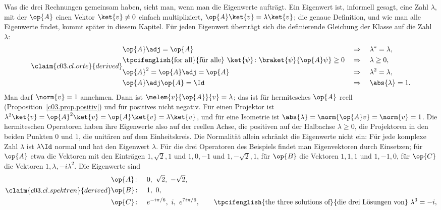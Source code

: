 Was die drei Rechnungen gemeinsam haben, sieht man, wenn man die Eigenwerte aufträgt. Ein
Eigenwert ist, informell gesagt, eine Zahl $\lambda$, mit der $\op{A}$ einen Vektor
$\ket{v} \neq 0$ einfach multipliziert, $\op{A}\ket{v} = \lambda\ket{v}$; die genaue Definition,
und wie man alle Eigenwerte findet, kommt später in diesem Kapitel. Für jeden Eigenwert
überträgt sich die definierende Gleichung der Klasse auf die Zahl $\lambda$:
\begin{equation}\label{c03.eq.orte}\claim{c03.cl.orte}{derived}
  \begin{aligned}
    &\op{A}\adj = \op{A} &&\Rightarrow\quad \lambda^* = \lambda , \\
    &\text{\tpcifenglish{for all}{für alle} } \ket{\psi}\colon \braket{\psi}{\op{A}\psi} \geq 0 &&\Rightarrow\quad \lambda \geq 0 , \\
    &\op{A}^2 = \op{A}\adj = \op{A} &&\Rightarrow\quad \lambda^2 = \lambda , \\
    &\op{A}\adj\op{A} = \Id &&\Rightarrow\quad \abs{\lambda} = 1 .
  \end{aligned}
\end{equation}
Man darf $\norm{v} = 1$ annehmen. Dann ist $\melem{v}{\op{A}}{v} = \lambda$; das ist für
hermitesches $\op{A}$ reell (Proposition~\ref{c03.prop.positiv}) und für positives nicht
negativ. Für einen Projektor ist $\lambda^2\ket{v} = \op{A}^2\ket{v} = \op{A}\ket{v} = \lambda\ket{v}$,
und für eine Isometrie ist $\abs{\lambda} = \norm{\op{A}v} = \norm{v} = 1$. Die hermiteschen
Operatoren haben ihre Eigenwerte also auf der reellen Achse, die positiven auf der Halbachse
$\lambda \geq 0$, die Projektoren in den beiden Punkten $0$ und $1$, die unitären auf dem
Einheitskreis. Die Normalität allein schränkt die Eigenwerte nicht ein: Für jede komplexe Zahl
$\lambda$ ist $\lambda\Id$ normal und hat den Eigenwert $\lambda$. Für die drei Operatoren des
Beispiels findet man Eigenvektoren durch Einsetzen; für $\op{A}$ etwa die Vektoren mit den
Einträgen $1, \sqrt{2}, 1$ und $1, 0, -1$ und $1, -\sqrt{2}, 1$, für $\op{B}$ die Vektoren
$1, 1, 1$ und $1, -1, 0$, für $\op{C}$ die Vektoren $1, \lambda, -i\lambda^2$. Die Eigenwerte
sind
\begin{equation}\label{c03.eq.spektren}\claim{c03.cl.spektren}{derived}
  \begin{aligned}
    &\op{A}\colon && 0 ,\ \sqrt{2} ,\ -\sqrt{2} , \\
    &\op{B}\colon && 1 ,\ 0 , \\
    &\op{C}\colon && e^{-i\pi/6} ,\ i ,\ e^{7i\pi/6} , \qquad \text{\tpcifenglish{the three solutions of}{die drei Lösungen von}}\ \lambda^3 = -i ,
  \end{aligned}
\end{equation}
